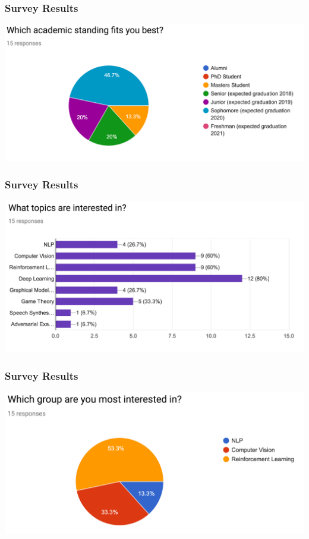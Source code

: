 \documentclass{beamer}
\begin{document}
\begin{frame}
  \frametitle{Survey Results}
  \begin{center}
    \includegraphics[width=0.8\linewidth]{feedback2.png}
  \end{center}
\end{frame}

\begin{frame}
  \frametitle{Survey Results}
  \begin{center}
    \includegraphics[width=0.8\linewidth]{feedback3.png}
  \end{center}
\end{frame}

\begin{frame}
  \frametitle{Survey Results}
  \begin{center}
    \includegraphics[width=0.8\linewidth]{feedback4.png}
  \end{center}
\end{frame}
\end{document}
